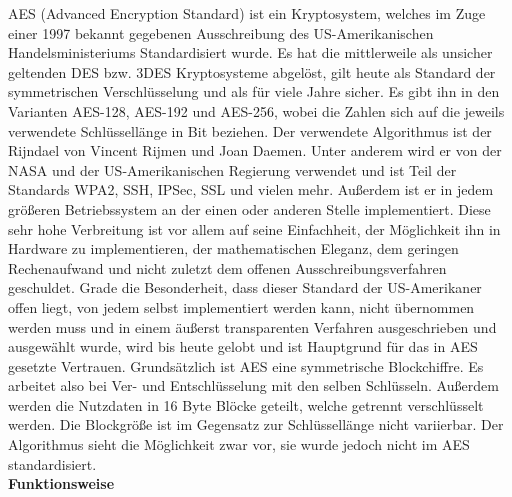 \documentclass[12pt,a4paper,bibliography=totocnumbered,listof=totocnumbered]{scrartcl}
\begin{document}
AES (Advanced Encryption Standard) ist ein Kryptosystem, welches im Zuge einer 1997 bekannt gegebenen Ausschreibung des US-Amerikanischen Handelsministeriums Standardisiert wurde. Es hat die mittlerweile als unsicher geltenden DES bzw. 3DES Kryptosysteme abgelöst, gilt heute als Standard der symmetrischen Verschlüsselung und als für viele Jahre sicher. Es gibt ihn in den Varianten AES-128, AES-192 und AES-256, wobei die Zahlen sich auf die jeweils verwendete Schlüssellänge in Bit beziehen. Der verwendete Algorithmus ist der Rijndael von Vincent Rijmen und Joan Daemen. Unter anderem wird er von der NASA und der US-Amerikanischen Regierung verwendet und ist Teil der Standards WPA2, SSH, IPSec, SSL und vielen mehr. Außerdem ist er in jedem größeren Betriebssystem an der einen oder anderen Stelle implementiert. Diese sehr hohe Verbreitung ist vor allem auf seine Einfachheit, der Möglichkeit ihn in Hardware zu implementieren, der mathematischen Eleganz, dem geringen Rechenaufwand und nicht zuletzt dem offenen Ausschreibungsverfahren geschuldet. Grade die Besonderheit, dass dieser Standard der US-Amerikaner offen liegt, von jedem selbst implementiert werden kann, nicht übernommen werden muss und in einem äußerst transparenten Verfahren ausgeschrieben und ausgewählt wurde, wird bis heute gelobt und ist Hauptgrund für das in AES gesetzte Vertrauen. Grundsätzlich ist AES eine symmetrische Blockchiffre. Es arbeitet also bei Ver- und Entschlüsselung mit den selben Schlüsseln. Außerdem werden die Nutzdaten in 16 Byte Blöcke geteilt, welche getrennt verschlüsselt werden. Die Blockgröße ist im Gegensatz zur Schlüssellänge nicht variierbar. Der Algorithmus sieht die Möglichkeit zwar vor, sie wurde jedoch nicht im AES standardisiert.
\\\textbf{Funktionsweise}\\ 
\end{document}
